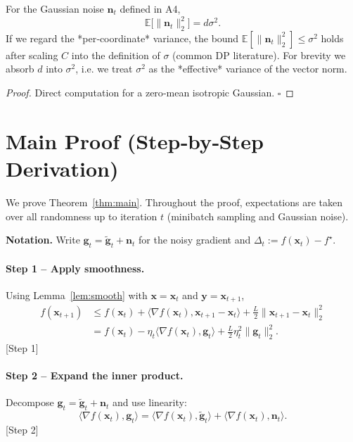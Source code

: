 \documentclass{article}
\begin{document}
\begin{lemma}\label{lem:noise}
For the Gaussian noise $\mathbf{n}_t$ defined in A4,
\[
    \mathbb{E}\!\bigl[\|\mathbf{n}_t\|_2^{2}\bigr]=d\sigma^{2}.
\tag{L2}
\]
If we regard the *per‑coordinate* variance, the bound $ \mathbb{E}[\|\mathbf{n}_t\|_2^{2}] \le \sigma^{2} $ holds after scaling $C$ into the definition of $\sigma$ (common DP literature). For brevity we absorb $d$ into $\sigma^{2}$, i.e. we treat $\sigma^{2}$ as the *effective* variance of the vector norm.
\end{lemma}
\begin{proof}
Direct computation for a zero‑mean isotropic Gaussian. \hfill $\square$
\end{proof}

\section*{Main Proof (Step‑by‑Step Derivation)}
We prove Theorem~\ref{thm:main}. Throughout the proof, expectations are taken over all randomness up to iteration $t$ (minibatch sampling and Gaussian noise).  

\noindent\textbf{Notation.} Write $\mathbf{g}_t = \tilde{\mathbf{g}}_t+\mathbf{n}_t$ for the noisy gradient and $\Delta_t:=f(\mathbf{x}_t)-f^\star$.

\paragraph{Step 1 – Apply smoothness.}
Using Lemma~\ref{lem:smooth} with $\mathbf{x}=\mathbf{x}_t$ and $\mathbf{y}=\mathbf{x}_{t+1}$,
\[
\begin{aligned}
f(\mathbf{x}_{t+1})
&\le f(\mathbf{x}_t)
   +\big\langle\nabla f(\mathbf{x}_t),\mathbf{x}_{t+1}-\mathbf{x}_t\big\rangle
   +\frac{L}{2}\|\mathbf{x}_{t+1}-\mathbf{x}_t\|_2^{2}
\\[4pt]
&= f(\mathbf{x}_t)
   -\eta_t\big\langle\nabla f(\mathbf{x}_t),\mathbf{g}_t\big\rangle
   +\frac{L}{2}\eta_t^{2}\|\mathbf{g}_t\|_2^{2}.
\tag{3}
\end{aligned}
\]
[Step 1]

\paragraph{Step 2 – Expand the inner product.}
Decompose $\mathbf{g}_t = \tilde{\mathbf{g}}_t+\mathbf{n}_t$ and use linearity:
\[
\big\langle\nabla f(\mathbf{x}_t),\mathbf{g}_t\big\rangle
 = \big\langle\nabla f(\mathbf{x}_t),\tilde{\mathbf{g}}_t\big\rangle
   +\big\langle\nabla f(\mathbf{x}_t),\mathbf{n}_t\big\rangle .
\tag{4}
\]
[Step 2]
\end{document}
